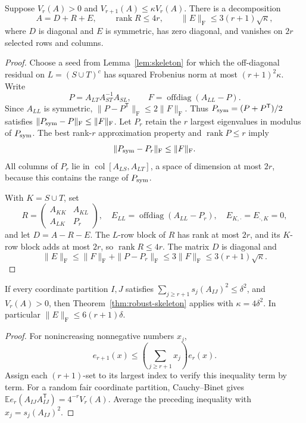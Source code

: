 \begin{theorem}
\label{thm:robust-skeleton}
Suppose \(V_r(A)>0\) and
\(V_{r+1}(A)\leq\kappa V_r(A)\).
There is a decomposition
\[
 A=D+R+E,\qquad
 \operatorname{rank}R\leq4r,\qquad
 \|E\|_{\mathrm F}\leq3(r+1)\sqrt\kappa,
\]
where \(D\) is diagonal and \(E\) is symmetric, has zero
diagonal, and vanishes on \(2r\) selected rows and columns.
\end{theorem}
\begin{proof}
Choose a seed from Lemma~\ref{lem:skeleton} for which the
off-diagonal residual on \(L=(S\cup T)^c\) has squared
Frobenius norm at most \((r+1)^2\kappa\).
Write
\[
 P=A_{LT}A_{ST}^{-1}A_{SL},\qquad
 F=\operatorname{offdiag}(A_{LL}-P).
\]
Since \(A_{LL}\) is symmetric,
\(\|P-P^{\mathsf T}\|_{\mathrm F}\leq2\|F\|_{\mathrm F}\).
Thus \(P_{\rm sym}=(P+P^{\mathsf T})/2\) satisfies
\(\|P_{\rm sym}-P\|_{\mathrm F}\leq\|F\|_{\mathrm F}\).
Let \(P_r\) retain the \(r\) largest eigenvalues in modulus
of \(P_{\rm sym}\).  The best rank-\(r\) approximation
property and \(\operatorname{rank}P\leq r\) imply
\[
 \|P_{\rm sym}-P_r\|_{\mathrm F}\leq\|F\|_{\mathrm F}.
\]
All columns of \(P_r\) lie in
\(\operatorname{col}[A_{LS},A_{LT}]\), a space of
dimension at most \(2r\), because this contains the range
of \(P_{\rm sym}\).

With \(K=S\cup T\), set
\[
 R=\begin{pmatrix}A_{KK}&A_{KL}\\A_{LK}&P_r\end{pmatrix},
 \quad
 E_{LL}=\operatorname{offdiag}(A_{LL}-P_r),
 \quad E_{K,\cdot}=E_{\cdot,K}=0,
\]
and let \(D=A-R-E\).  The \(L\)-row block of \(R\) has
rank at most \(2r\), and its \(K\)-row block adds at most
\(2r\), so \(\operatorname{rank}R\leq4r\).
The matrix \(D\) is diagonal and
\[
 \|E\|_{\mathrm F}
 \leq\|F\|_{\mathrm F}+\|P-P_r\|_{\mathrm F}
 \leq3\|F\|_{\mathrm F}
 \leq3(r+1)\sqrt\kappa.
\]
\end{proof}

\begin{corollary}
\label{cor:tail-skeleton}
If every coordinate partition \(I,J\) satisfies
\(\sum_{j\geq r+1}s_j(A_{IJ})^2\leq\delta^2\), and
\(V_r(A)>0\), then Theorem~\ref{thm:robust-skeleton}
applies with \(\kappa=4\delta^2\).  In particular
\(\|E\|_{\mathrm F}\leq6(r+1)\delta\).
\end{corollary}
\begin{proof}
For nonincreasing nonnegative numbers \(x_j\),
\[
 e_{r+1}(x)\leq
 \left(\sum_{j\geq r+1}x_j\right)e_r(x).
\]
Assign each \((r+1)\)-set to its largest index to verify
this inequality term by term.
For a random fair coordinate partition, Cauchy--Binet gives
\(\mathbb Ee_r(A_{IJ}A_{IJ}^{\mathsf T})=4^{-r}V_r(A)\).
Average the preceding inequality with \(x_j=s_j(A_{IJ})^2\).
\end{proof}

